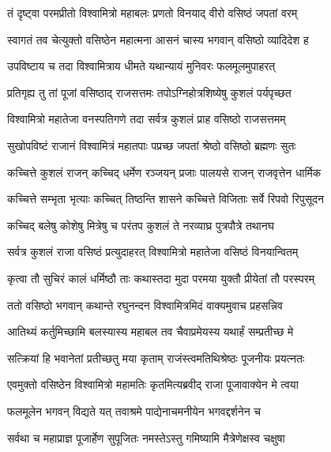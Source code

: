 
\twolineshloka
{तं दृष्ट्वा परमप्रीतो विश्वामित्रो महाबलः}
{प्रणतो विनयाद् वीरो वसिष्ठं जपतां वरम्} %

\twolineshloka
{स्वागतं तव चेत्युक्तो वसिष्ठेन महात्मना}
{आसनं चास्य भगवान् वसिष्ठो व्यादिदेश ह} %

\twolineshloka
{उपविष्टाय च तदा विश्वामित्राय धीमते}
{यथान्यायं मुनिवरः फलमूलमुपाहरत्} %

\twolineshloka
{प्रतिगृह्य तु तां पूजां वसिष्ठाद् राजसत्तमः}
{तपोऽग्निहोत्रशिष्येषु कुशलं पर्यपृच्छत} %

\twolineshloka
{विश्वामित्रो महातेजा वनस्पतिगणे तदा}
{सर्वत्र कुशलं प्राह वसिष्ठो राजसत्तमम्} %

\twolineshloka
{सुखोपविष्टं राजानं विश्वामित्रं महातपाः}
{पप्रच्छ जपतां श्रेष्ठो वसिष्ठो ब्रह्मणः सुतः} %

\twolineshloka
{कच्चित्ते कुशलं राजन् कच्चिद् धर्मेण रञ्जयन्}
{प्रजाः पालयसे राजन् राजवृत्तेन धार्मिक} %

\twolineshloka
{कच्चित्ते सम्भृता भृत्याः कच्चित् तिष्ठन्ति शासने}
{कच्चित्ते विजिताः सर्वे रिपवो रिपुसूदन} %

\twolineshloka
{कच्चिद् बलेषु कोशेषु मित्रेषु च परंतप}
{कुशलं ते नरव्याघ्र पुत्रपौत्रे तथानघ} %

\twolineshloka
{सर्वत्र कुशलं राजा वसिष्ठं प्रत्युदाहरत्}
{विश्वामित्रो महातेजा वसिष्ठं विनयान्वितम्} %

\twolineshloka
{कृत्वा तौ सुचिरं कालं धर्मिष्ठौ ताः कथास्तदा}
{मुदा परमया युक्तौ प्रीयेतां तौ परस्परम्} %

\twolineshloka
{ततो वसिष्ठो भगवान् कथान्ते रघुनन्दन}
{विश्वामित्रमिदं वाक्यमुवाच प्रहसन्निव} %

\twolineshloka
{आतिथ्यं कर्तुमिच्छामि बलस्यास्य महाबल}
{तव चैवाप्रमेयस्य यथार्हं सम्प्रतीच्छ मे} %

\twolineshloka
{सत्क्रियां हि भवानेतां प्रतीच्छतु मया कृताम्}
{राजंस्त्वमतिथिश्रेष्ठः पूजनीयः प्रयत्नतः} %

\twolineshloka
{एवमुक्तो वसिष्ठेन विश्वामित्रो महामतिः}
{कृतमित्यब्रवीद् राजा पूजावाक्येन मे त्वया} %

\twolineshloka
{फलमूलेन भगवन् विद्यते यत् तवाश्रमे}
{पाद्येनाचमनीयेन भगवद्दर्शनेन च} %

\twolineshloka
{सर्वथा च महाप्राज्ञ पूजार्हेण सुपूजितः}
{नमस्तेऽस्तु गमिष्यामि मैत्रेणेक्षस्व चक्षुषा} %

